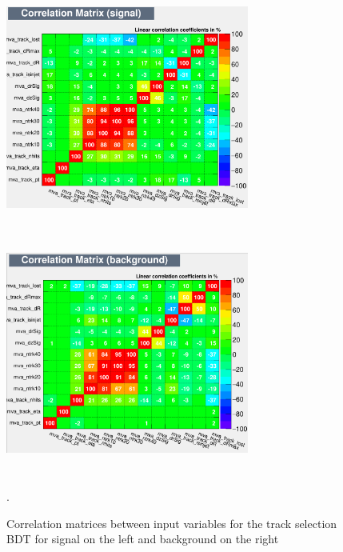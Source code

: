 \documentclass{cernatlasnote}
\begin{document}
\begin{appendices}
\begin{figure}[ht]
\centering
\includegraphics[height=8cm, width=8cm, trim= 0cm 0cm 0cm 0cm,clip]{images/TRKBDT/BDTDaniel_CORS.png}\includegraphics[height=8cm, width=8cm, trim= 0cm 0cm 0cm 0cm,clip]{images/TRKBDT/BDTDaniel_CORB.png}
\caption{\label{fig:TRKCOR} Correlation matrices between input variables for the track selection BDT for signal on the left and background on the right}.
\end{figure} 


\end{appendices}
\end{document}
